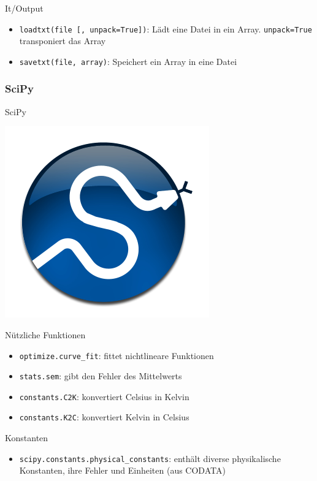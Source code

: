 \begin{frame}{It/Output}
  \begin{itemize}
    \item \texttt{loadtxt(file [, unpack=True])}: Lädt eine Datei in ein Array.
      \texttt{unpack=True} transponiert das Array
    \item \texttt{savetxt(file, array)}: Speichert ein Array in eine Datei
  \end{itemize}
\end{frame}

\subsubsection{SciPy}
\begin{frame}{SciPy}
  \begin{center}
    \includegraphics{../Notes/img/scipy.pdf}
  \end{center}
\end{frame}

\begin{frame}{Nützliche Funktionen}
  \begin{itemize}
    \item \texttt{optimize.curve\_fit}: fittet nichtlineare Funktionen
    \item \texttt{stats.sem}: gibt den Fehler des Mittelwerts
    \item \texttt{constants.C2K}: konvertiert Celsius in Kelvin
    \item \texttt{constants.K2C}: konvertiert Kelvin in Celsius
  \end{itemize}
\end{frame}

\begin{frame}{Konstanten}
  \begin{itemize}
    \item \texttt{scipy.constants.physical\_constants}: enthält diverse physikalische Konstanten, ihre Fehler und Einheiten (aus CODATA)
  \end{itemize}
\end{frame}

